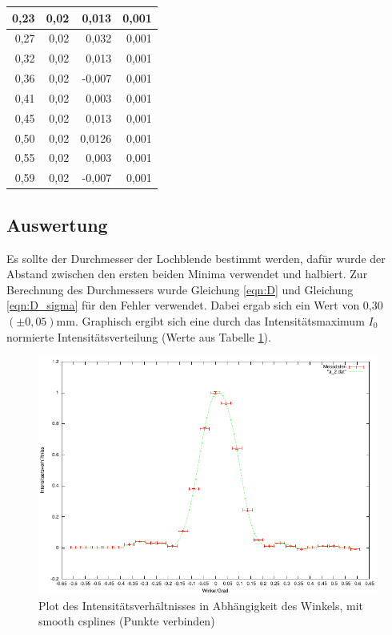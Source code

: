 \documentclass[12pt]{scrartcl}
\begin{document}
\begin{table}[H]
\begin{center}
\begin{tabular}{|r|r|r|r|}
0,23 & 0,02 & 0,013 & 0,001 \\ \hline
0,27 & 0,02 & 0,032 & 0,001 \\ \hline
0,32 & 0,02 & 0,013 & 0,001 \\ \hline
0,36 & 0,02 & -0,007 & 0,001 \\ \hline
0,41 & 0,02 & 0,003 & 0,001 \\ \hline
0,45 & 0,02 & 0,013 & 0,001 \\ \hline
0,50 & 0,02 & 0,0126 & 0,001 \\ \hline
0,55 & 0,02 & 0,003 & 0,001 \\ \hline
0,59 & 0,02 & -0,007 & 0,001 \\ \hline
\end{tabular}
\end{center}
\label{tab:a_2_m}
\end{table}



\subsection{Auswertung}
Es sollte der Durchmesser der Lochblende bestimmt werden, dafür wurde der Abstand zwischen den ersten beiden Minima verwendet und halbiert. Zur Berechnung des Durchmessers wurde Gleichung \ref{eqn:D} und Gleichung \ref{eqn:D_sigma} für den Fehler verwendet. Dabei ergab sich ein Wert von 0,30 $(\pm 0,05)$mm. Graphisch ergibt sich eine durch das Intensitätsmaximum $I_0$ normierte Intensitätsverteilung (Werte aus Tabelle \ref{tab:a_2_m}).

\begin{figure}[H]
\centering
    \includegraphics[scale = 1]{a_2.pdf}
  	\caption[Plot des Intensitätsverhältnisses in Abhängigkeit des Winkels, mit smooth csplines (Punkte verbinden)]{Plot des Intensitätsverhältnisses in Abhängigkeit des Winkels, mit smooth csplines (Punkte verbinden)}
  \label{fig:a_2}
\end{figure}
\end{document}
